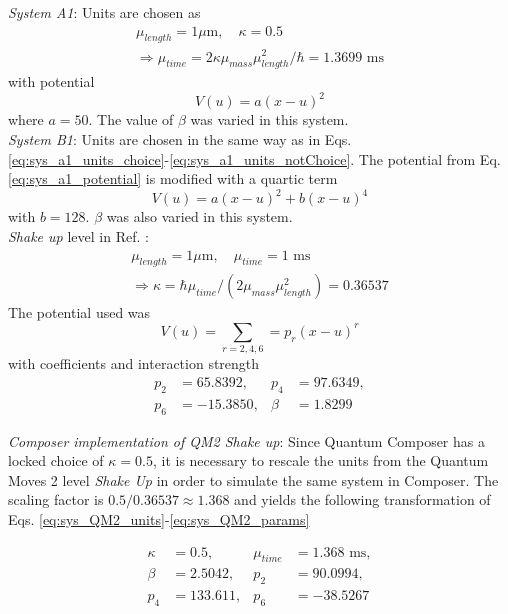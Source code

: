 \documentclass[a4paper, twocolumn]{revtex4-1}
\begin{document}
\textit{System A1}: Units are chosen as
\begin{subequations}
	\begin{gather}
		\mu_{length} = 1 \mu\text{m}, \quad \kappa = 0.5 \label{eq:sys_a1_units_choice}\\
		\Rightarrow \mu_{time} = 2\kappa \mu_{mass}\mu^2_{length} / \hbar = 1.3699\text{ ms} \label{eq:sys_a1_units_notChoice}
	\end{gather}
\end{subequations}
with potential 
\begin{equation}
	V(u) = a(x-u)^2
	\label{eq:sys_a1_potential}
\end{equation}
where $a = 50$. The value of $\beta$ was varied in this system. \\

\textit{System B1}: Units are chosen in the same way as in Eqs. \eqref{eq:sys_a1_units_choice}-\eqref{eq:sys_a1_units_notChoice}. The potential from Eq. \eqref{eq:sys_a1_potential} is modified with a quartic term
\begin{equation}
	V(u) = a(x-u)^2 + b(x-u)^4
	\label{eq:sys_b1_potential}
\end{equation} 
with $b = 128$. $\beta$ was also varied in this system. \\
\textit{Shake up} level in Ref. \cite{QM2Paper}:
\begin{subequations}\label{eq:sys_QM2_units}
	\begin{gather}
		\mu_{length} = 1 \mu\text{m}, \quad \mu_{time} = 1\text{ ms} \label{eq:sys_QM2_units_choice}\\
		\Rightarrow \kappa = \hbar \mu_{time} / (2 \mu_{mass} \mu^2_{length}) = 0.36537 \label{eq:sys_QM2_units_notChoice}
	\end{gather}
\end{subequations}
The potential used was
\begin{equation}
	V(u) = \sum\limits_{r = 2,4,6} = p_r (x - u)^r
	\label{eq:sys_QM2_potential}
\end{equation} 
with coefficients and interaction strength
\begin{subequations}\label{eq:sys_QM2_params}
	\begin{align}
		p_2& = 65.8392,& p_4& = 97.6349, \\
		p_6& = -15.3850,& \beta& = 1.8299
	\end{align}
\end{subequations}

\textit{Composer implementation of QM2 Shake up}:
Since Quantum Composer has a locked choice of $\kappa = 0.5$, it is necessary to rescale the units from the Quantum Moves 2 level \textit{Shake Up} in order to simulate the same system in Composer. The scaling factor is $0.5/0.36537 \approx 1.368$ and yields the following transformation of Eqs. \eqref{eq:sys_QM2_units}-\eqref{eq:sys_QM2_params}

\begin{subequations} \label{eq:sys_compQM2_params}
	\begin{align}
		\kappa& = 0.5,& \mu_{time}& =1.368\text{ ms}, \\
		\beta& = 2.5042,& p_2& = 90.0994, \\
		p_4& = 133.611,& p_6 &= -38.5267
	\end{align}
\end{subequations}
\end{document}
